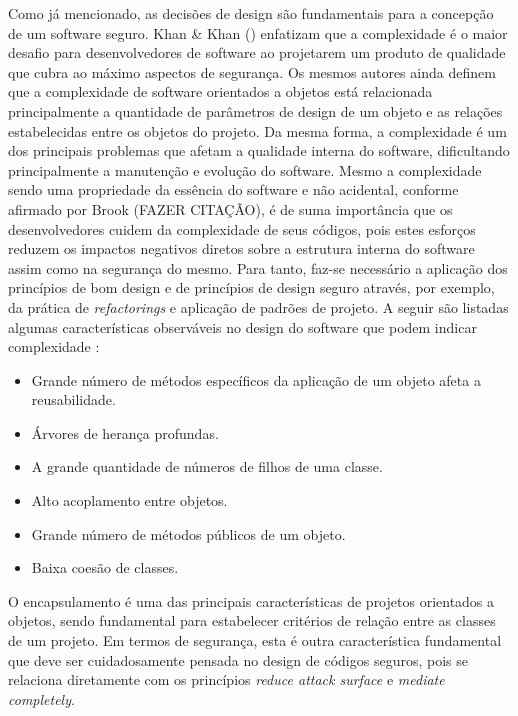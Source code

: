%

Como já mencionado, as decisões de design são fundamentais para a concepção de um software seguro. Khan \& Khan (\citeyear{khan2010}) enfatizam que a complexidade é o maior desafio para desenvolvedores de software ao projetarem um produto de qualidade que cubra ao máximo aspectos de segurança. Os mesmos autores ainda definem que a complexidade de software orientados a objetos está relacionada principalmente a quantidade de parâmetros de design de um objeto e as relações estabelecidas entre os objetos do projeto. Da mesma forma, a complexidade é um dos principais problemas que afetam a qualidade interna do software, dificultando principalmente a manutenção e evolução do software. Mesmo a complexidade sendo uma propriedade da essência do software e não acidental, conforme afirmado por Brook (FAZER CITAÇÃO), é de suma importância que os desenvolvedores cuidem da complexidade de seus códigos, pois estes esforços reduzem os impactos negativos diretos sobre a estrutura interna do software assim como na segurança do mesmo. Para tanto, faz-se necessário a aplicação dos princípios de bom design e de princípios de design seguro através, por exemplo, da prática de \emph{refactorings} e aplicação de padrões de projeto. A seguir são listadas algumas características observáveis no design do software que podem indicar complexidade \cite{khan2010}:

%

\begin{itemize}
\item Grande número de métodos específicos da aplicação de um objeto afeta a reusabilidade.
\item Árvores de herança profundas.
\item A grande quantidade de números de filhos de uma classe.
\item Alto acoplamento entre objetos.
\item Grande número de métodos públicos de um objeto.
\item Baixa coesão de classes. 
\end{itemize}

%

O encapsulamento é uma das principais características de projetos orientados a objetos, sendo fundamental para estabelecer critérios de relação entre as classes de um projeto. Em termos de segurança, esta é outra característica fundamental que deve ser cuidadosamente pensada no design de códigos seguros, pois se relaciona diretamente com os princípios \emph{reduce attack surface} e \emph{mediate completely}.

